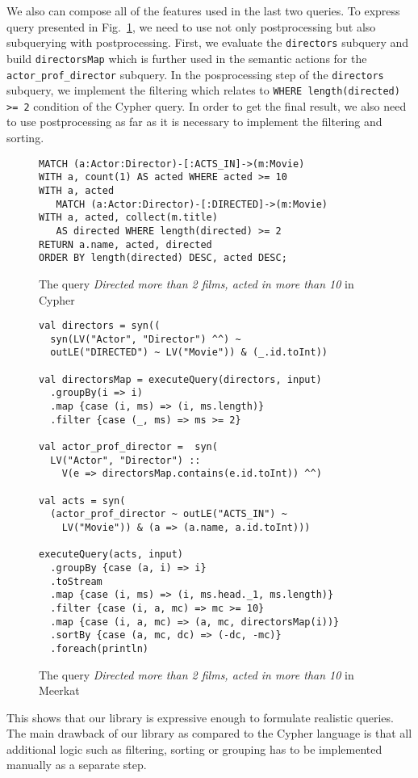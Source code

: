 We also can compose all of the features used in the last two queries.
To express query presented in Fig.~\ref{fig:Q3_C}, we need to use not only postprocessing but also subquerying with postprocessing.
First, we evaluate the \lstinline{directors} subquery and build \lstinline{directorsMap} which is further used in the semantic actions for the \lstinline{actor_prof_director} subquery.
In the posprocessing step of the \lstinline{directors} subquery, we implement the filtering which relates to \lstinline{WHERE length(directed) >= 2} condition of the Cypher query.
In order to get the final result, we also need to use postprocessing as far as it is necessary to implement the filtering and sorting.

\begin{figure}[h]
\begin{lstlisting}
MATCH (a:Actor:Director)-[:ACTS_IN]->(m:Movie)
WITH a, count(1) AS acted WHERE acted >= 10
WITH a, acted
   MATCH (a:Actor:Director)-[:DIRECTED]->(m:Movie)
WITH a, acted, collect(m.title)
   AS directed WHERE length(directed) >= 2
RETURN a.name, acted, directed
ORDER BY length(directed) DESC, acted DESC;
\end{lstlisting}
\caption{The query \emph{Directed more than 2 films, acted in more than 10} in Cypher}
\label{fig:Q3_C}
\end{figure}


\begin{figure}[h]
\begin{lstlisting}
val directors = syn((
  syn(LV("Actor", "Director") ^^) ~
  outLE("DIRECTED") ~ LV("Movie")) & (_.id.toInt))

val directorsMap = executeQuery(directors, input)
  .groupBy(i => i)
  .map {case (i, ms) => (i, ms.length)}
  .filter {case (_, ms) => ms >= 2}

val actor_prof_director =  syn(
  LV("Actor", "Director") ::
    V(e => directorsMap.contains(e.id.toInt)) ^^)

val acts = syn(
  (actor_prof_director ~ outLE("ACTS_IN") ~
    LV("Movie")) & (a => (a.name, a.id.toInt)))

executeQuery(acts, input)
  .groupBy {case (a, i) => i}
  .toStream
  .map {case (i, ms) => (i, ms.head._1, ms.length)}
  .filter {case (i, a, mc) => mc >= 10}
  .map {case (i, a, mc) => (a, mc, directorsMap(i))}
  .sortBy {case (a, mc, dc) => (-dc, -mc)}
  .foreach(println)

\end{lstlisting}
\caption{The query \emph{Directed more than 2 films, acted in more than 10} in Meerkat}
\label{fig:helpers}
\end{figure}

This shows that our library is expressive enough to formulate realistic queries.
The main drawback of our library as compared to the Cypher language is that all additional logic such as
filtering, sorting or grouping has to be implemented manually as a separate step.